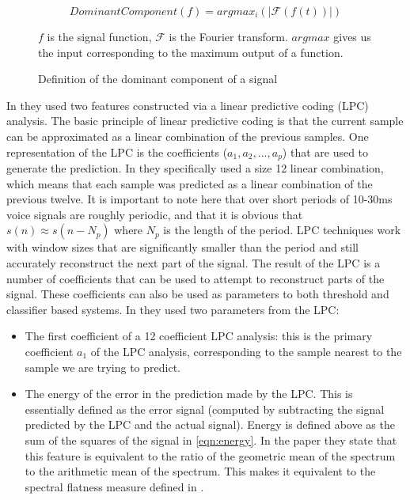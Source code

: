 \documentclass[ %
                    author={Sam Phippen},
                supervisor={Dr. Rafal Bogacz},
                     title={Real time voice activity detectors in noisy personal computing environments},
                  subtitle={},
                    degree={MEng},
                      year={2012} ]{thesis}
\begin{document}
\begin{figure}
    $$DominantComponent(f) = argmax_i(|\mathcal{F}(f(t))|)$$

    $f$ is the signal
    function, $\mathcal{F}$ is the Fourier transform. $argmax$ gives us the
    input corresponding to the maximum output of a function.
    \caption{Definition of the dominant component of a signal}
    \label{eqn:dom-freq}
\end{figure}

In \cite{atal} they used two features constructed via a linear predictive
coding (LPC) analysis. The basic principle of linear predictive coding is that
the current sample can be approximated as a linear combination of the previous
samples\cite{rabiner}. One representation of the LPC is the coefficients
($a_1,a_2,...,a_p$) that are used to generate the prediction. In \cite{atal}
they specifically used a size 12 linear combination, which means that each
sample was predicted as a linear combination of the previous twelve. It is
important to note here that over short periods of 10-30ms voice signals are
roughly periodic, and that it is obvious that $s(n) \approx s(n-N_p)$ where
$N_p$ is the length of the period. LPC techniques work with window sizes that
are significantly smaller than the period and still accurately reconstruct the
next part of the signal. The result of the LPC is a number of coefficients that
can be used to attempt to reconstruct parts of the signal. These coefficients can
also be used as parameters to both threshold and classifier based systems. In
\cite{atal} they used two parameters from the LPC:

\begin{itemize}

    \item The first coefficient of a 12 coefficient LPC analysis: this is the
        primary coefficient $a_1$ of the LPC analysis, corresponding to the
        sample nearest to the sample we are trying to predict.

    \item The energy of the error in the prediction made by the LPC. This is
        essentially defined as the error signal (computed by subtracting the
        signal predicted by the LPC and the actual signal). Energy is defined
        above as the sum of the squares of the signal in \ref{eqn:energy}. In
        the paper they state that this feature is equivalent to the ratio of
        the geometric mean of the spectrum to the arithmetic mean of the
        spectrum. This makes it equivalent to the spectral flatness measure
        defined in \cite{moattar}.

\end{itemize}
\end{document}
